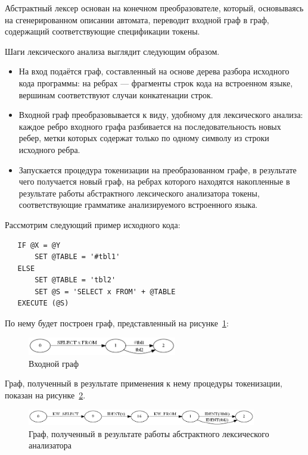 Абстрактный лексер основан на конечном преобразователе, который, 
основываясь на сгенерированном описании автомата, переводит 
входной граф в граф, содержащий соответствующие спецификации токены. 

Шаги лексического анализа выглядит следующим образом.
\begin{itemize}
    \item На вход подаётся граф, составленный на основе дерева разбора исходного 
    кода программы: на ребрах --- фрагменты строк кода на встроенном языке, 
    вершинам соответствуют случаи конкатенации строк.
    \item Входной граф преобразовывается к виду, удобному для лексического 
    анализа: каждое ребро входного графа разбивается на последовательность новых 
    ребер, метки которых содержат только по одному символу из строки исходного 
    ребра.
    \item Запускается процедура токенизации на преобразованном графе, в 
    результате чего получается новый граф, на ребрах которого находятся 
    накопленные в результате работы абстрактного лексического анализатора 
    токены, соответствующие грамматике анализируемого встроенного языка.
\end{itemize}

Рассмотрим следующий пример исходного кода:

\begin{verbatim}
   IF @X = @Y
       SET @TABLE = '#tbl1'
   ELSE
       SET @TABLE = 'tbl2'
       SET @S = 'SELECT x FROM' + @TABLE
   EXECUTE (@S)
\end{verbatim}

По нему будет построен граф, представленный на рисунке~\ref{SimpleSql}:
\begin{figure}[h]
 \label{SimpleSql}
 \centering
 \includegraphics[width=6.5cm]{Verbitskaya/SimpleSql.png}
 \caption{Входной граф}
 \label{SimpleSql}
\end{figure}

Граф, полученный в результате применения к нему процедуры токенизации,  
показан на рисунке~\ref{SimpleSqlLex}.

\begin{figure}[h]
 \label{SimpleSqlLex}
 \centering
 \includegraphics[width=10cm]{Verbitskaya/SimpleSql_lex.png}
 \caption{Граф, полученный в результате работы абстрактного лексического анализатора}
 \label{SimpleSqlLex}
\end{figure}

